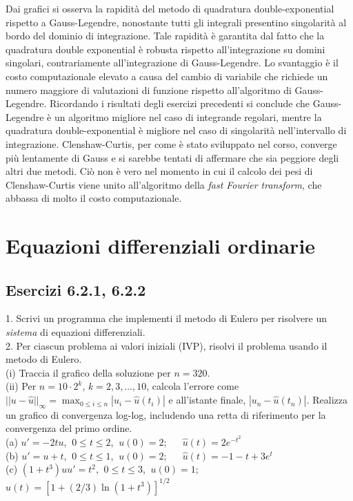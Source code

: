 \documentclass[letterpaper, 12pt]{article}
\numberwithin{equation}{section}    %
\begin{document}
Dai grafici si osserva la rapidità del metodo di quadratura double-exponential rispetto a Gauss-Legendre, 
nonostante tutti gli integrali presentino singolarità al bordo del dominio di integrazione. Tale rapidità
è garantita dal fatto che la quadratura double exponential è robusta rispetto all'integrazione su domini singolari,
contrariamente all'integrazione di Gauss-Legendre. Lo svantaggio è il costo computazionale elevato a causa 
del cambio di variabile che richiede un numero
maggiore di valutazioni di funzione rispetto all'algoritmo di Gauss-Legendre. Ricordando i risultati
degli esercizi precedenti si conclude che Gauss-Legendre è un algoritmo migliore nel caso di integrande 
regolari, mentre la quadratura double-exponential è migliore nel caso di singolarità nell'intervallo di 
integrazione. Clenshaw-Curtis, per come è stato sviluppato nel corso, converge più lentamente di Gauss e 
si sarebbe tentati di affermare che sia peggiore degli altri due metodi. Ciò non è vero nel momento in cui
il calcolo dei pesi di Clenshaw-Curtis viene unito all'algoritmo della \textit{fast Fourier transform},
che abbassa di molto il costo computazionale.

\section{Equazioni differenziali ordinarie}
\subsection{Esercizi 6.2.1, 6.2.2}
1. Scrivi un programma che implementi il metodo di Eulero per risolvere un \textit{sistema} 
di equazioni differenziali.\\
2. Per ciascun problema ai valori iniziali (IVP), risolvi il problema usando il metodo di Eulero. \\
(i) Traccia il grafico della soluzione per $n=320$. \\
(ii) Per $n=10\cdot2^k$, $k=2,3,\ldots,10$, calcola l'errore come 
$||u-\hat{u}||_\infty=\max_{0\leq i\leq n} |u_i-\hat{u}(t_i)|$ e all'istante finale, $|u_n-\hat{u}(t_n)|$. 
Realizza un grafico di convergenza log-log, includendo una retta di riferimento per la convergenza del 
primo ordine.\\
(a) $u' = -2t u$, $\ 0 \le t \le 2$, $\ u(0) = 2$;  
$\quad$ $\hat{u}(t) = 2e^{-t^2}$ \\
(b) $u' = u + t$, $\ 0 \le t \le 1$, $\ u(0) = 2$;  
$\quad$ $\hat{u}(t) = -1-t+3e^t$ \\
(c) $(1+t^3)uu' = t^2$, $\ 0 \le t \le 3$, $\ u(0) =1$; 
$\quad$ $\hat{u}(t) = [1+(2/3)\ln (1+t^3)]^{1/2}$
\end{document}
